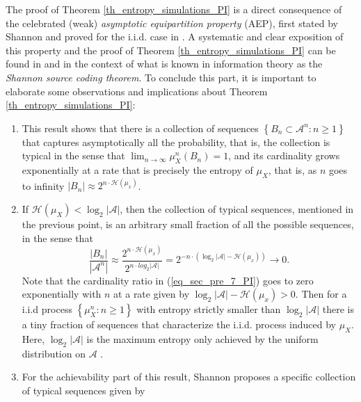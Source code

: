The proof of Theorem \ref{th_entropy_simulations_PI} is a direct consequence of the celebrated  (weak) {\em asymptotic equipartition property} (AEP),  first stated by Shannon and proved for the i.i.d. case in %
 \citep{shannon_1948}.  A systematic and clear exposition of this property and the proof of Theorem \ref{th_entropy_simulations_PI} can be found in \citep[Chap.3]{cover_2006} and \citep[Chap.4]{yeung_2002} in the context of what is known in information theory as the {\em Shannon source coding theorem}.  To conclude this part, it is important to elaborate some observations and implications about Theorem \ref{th_entropy_simulations_PI}:
\begin{enumerate}
\item This result shows that there is a collection of sequences $\left\{ B_n\subset \mathcal{A}^n: n\geq 1\right\}$ that captures asymptotically all the probability, that is,  the collection is typical in the sense that $\lim_{n \rightarrow \infty} \mu_X^n(B_n)=1$,  and its cardinality grows exponentially at a rate that is precisely the entropy of $\mu_X$, that is,  as $n$ goes to infinity $\left| B_n \right| \approx 2^{n\cdot \mathcal{H}(\mu_x)}$.
\item  If $\mathcal{H}(\mu_X) < \log_2 \left|\mathcal{A}\right|$, then the collection of typical sequences,  mentioned in the previous point, is an arbitrary small fraction of all the possible sequences, in the sense that
\begin{equation}\label{eq_sec_pre_7_PI}
	\frac{\left| B_n \right|}{\left| \mathcal{A}^n \right|} \approx \frac{2^{n\cdot \mathcal{H}(\mu_x)}}{2^{n\cdot log_2 \left|\mathcal{A}\right|}}= 2^{-n\cdot (\log_2 \left|\mathcal{A}\right|-\mathcal{H}(\mu_x) )} \longrightarrow 0. 
\end{equation}
Note that the cardinality ratio in (\ref{eq_sec_pre_7_PI}) goes to zero exponentially with $n$ at a rate given by $\log_2 \left|\mathcal{A}\right|-\mathcal{H}(\mu_x)>0$. Then for a i.i.d process $\left\{\mu_X^n: n\geq 1\right\}$  with entropy strictly smaller than $\log_2 \left|\mathcal{A}\right|$ there is a tiny fraction of sequences that characterize the  i.i.d. process induced by $\mu_X$. Here, { $\log_2 \left|\mathcal{A}\right|$ is the maximum entropy only achieved  by the uniform distribution on $\mathcal{A}$ \citep{cover_2006}.}
\item For the achievability part of this result, Shannon proposes a specific collection of typical sequences given by
\begin{equation}\label{eq_sec_pre_8_PI}

\end{equation}
\end{enumerate}
